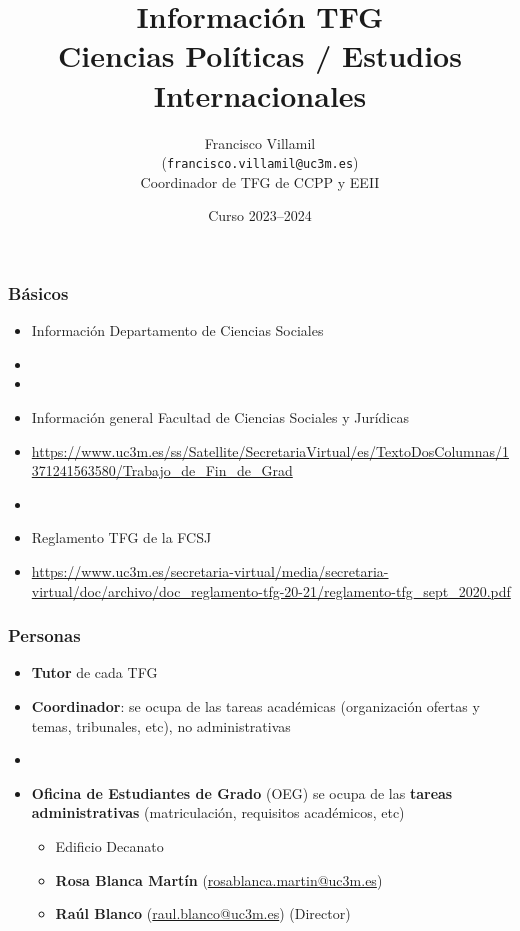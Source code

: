 \documentclass[aspectratio=43]{beamer}
\title{Información TFG\\Ciencias Políticas / Estudios Internacionales}
\author{Francisco Villamil\\(\texttt{francisco.villamil@uc3m.es})\\Coordinador de TFG de CCPP y EEII}
\date{Curso 2023--2024}
\begin{document}

\begin{frame}
  \titlepage
\end{frame}

\begin{frame}
\frametitle{Básicos}
\centering

\begin{itemize}
  \item Información Departamento de Ciencias Sociales
  \item[] 
  \item[]
  \item Información general Facultad de Ciencias Sociales y Jurídicas
  \item[] {\footnotesize \url{https://www.uc3m.es/ss/Satellite/SecretariaVirtual/es/TextoDosColumnas/1371241563580/Trabajo_de_Fin_de_Grad}}
  \item[]
  \item Reglamento TFG de la FCSJ
  \item[] {\footnotesize \url{https://www.uc3m.es/secretaria-virtual/media/secretaria-virtual/doc/archivo/doc_reglamento-tfg-20-21/reglamento-tfg_sept_2020.pdf}}
\end{itemize}

\end{frame}

\begin{frame}
\frametitle{Personas}
\centering

\begin{itemize}
  \item \textbf{Tutor} de cada TFG
  \item \textbf{Coordinador}: se ocupa de las tareas académicas (organización ofertas y temas, tribunales, etc), no administrativas
  \item[]
  \item \textbf{Oficina de Estudiantes de Grado} (OEG) se ocupa de las \textbf{tareas administrativas} (matriculación, requisitos académicos, etc)
  \begin{itemize}
    \item Edificio Decanato
    \item \textbf{Rosa Blanca Martín} (\url{rosablanca.martin@uc3m.es})
    \item \textbf{Raúl Blanco} (\url{raul.blanco@uc3m.es}) (Director)
  \end{itemize}
\end{itemize}

\end{frame}
\end{document}
